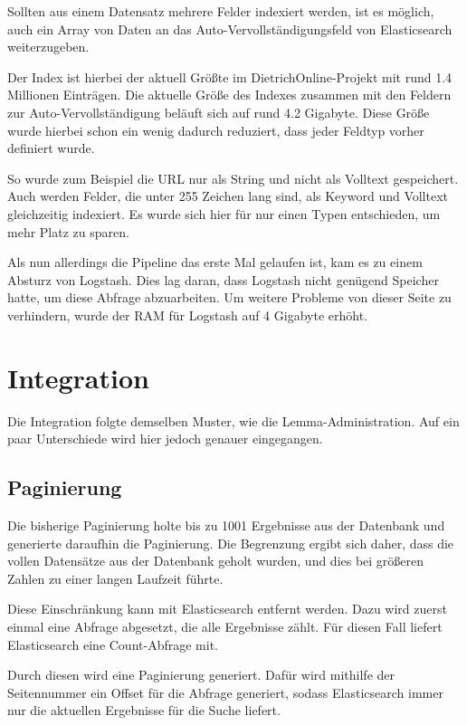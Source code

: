Sollten aus einem Datensatz mehrere Felder indexiert werden, ist es möglich, auch ein Array von Daten an das Auto-Vervollständigungsfeld von Elasticsearch weiterzugeben.

Der Index ist hierbei der aktuell Größte im DietrichOnline-Projekt mit rund 1.4 Millionen Einträgen. Die aktuelle Größe des Indexes zusammen mit den Feldern zur Auto-Vervollständigung beläuft sich auf rund 4.2 Gigabyte. 
Diese Größe wurde hierbei schon ein wenig dadurch reduziert, dass jeder Feldtyp vorher definiert wurde.

So wurde zum Beispiel die URL nur als String und nicht als Volltext gespeichert. Auch werden Felder, die unter 255 Zeichen lang sind, als Keyword und Volltext gleichzeitig indexiert. Es wurde sich hier für nur einen Typen entschieden, um mehr Platz zu sparen.

Als nun allerdings die Pipeline das erste Mal gelaufen ist, kam es zu einem Absturz von Logstash. Dies lag daran, dass Logstash nicht genügend Speicher hatte, um diese Abfrage abzuarbeiten. Um weitere Probleme von dieser Seite zu verhindern, wurde der RAM für Logstash auf 4 Gigabyte erhöht.

\section{Integration}

Die Integration folgte demselben Muster, wie die Lemma-Administration. Auf ein paar Unterschiede wird hier jedoch genauer eingegangen. 

\subsection{Paginierung}

Die bisherige Paginierung holte bis zu 1001 Ergebnisse aus der Datenbank und generierte daraufhin die Paginierung. Die Begrenzung ergibt sich daher, dass die vollen Datensätze aus der Datenbank geholt wurden, und dies bei größeren Zahlen zu einer langen Laufzeit führte.

Diese Einschränkung kann mit Elasticsearch entfernt werden. Dazu wird zuerst einmal eine Abfrage abgesetzt, die alle Ergebnisse zählt. Für diesen Fall liefert Elasticsearch eine Count-Abfrage mit.

Durch diesen wird eine Paginierung generiert. Dafür wird mithilfe der Seitennummer ein Offset für die Abfrage generiert, sodass Elasticsearch immer nur die aktuellen Ergebnisse für die Suche liefert.

